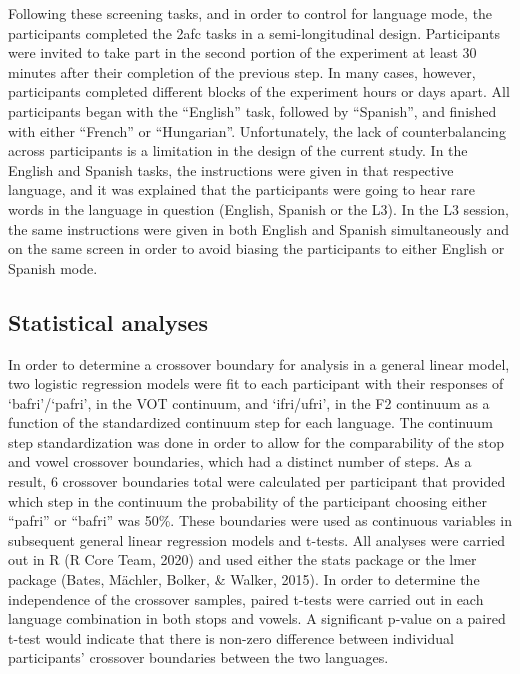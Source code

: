 \documentclass[
  man]{apa6}
\begin{document}
Following these screening tasks, and in order to control for language mode, the participants completed the 2afc tasks in a semi-longitudinal design.
Participants were invited to take part in the second portion of the experiment at least 30 minutes after their completion of the previous step. In many cases, however, participants completed different blocks of the experiment hours or days apart.
All participants began with the ``English'' task, followed by ``Spanish'', and finished with either ``French'' or ``Hungarian''. Unfortunately, the lack of counterbalancing across participants is a limitation in the design of the current study.
In the English and Spanish tasks, the instructions were given in that respective language, and it was explained that the participants were going to hear rare words in the language in question (English, Spanish or the L3).
In the L3 session, the same instructions were given in both English and Spanish simultaneously and on the same screen in order to avoid biasing the participants to either English or Spanish mode.

\hypertarget{statistical-analyses}{%
\subsection{Statistical analyses}\label{statistical-analyses}}

In order to determine a crossover boundary for analysis in a general linear model, two logistic regression models were fit to each participant with their responses of `bafri'/`pafri', in the VOT continuum, and `ifri/ufri', in the F2 continuum as a function of the standardized continuum step for each language.
The continuum step standardization was done in order to allow for the comparability of the stop and vowel crossover boundaries, which had a distinct number of steps.
As a result, 6 crossover boundaries total were calculated per participant that provided which step in the continuum the probability of the participant choosing either ``pafri'' or ``bafri'' was 50\%. These boundaries were used as continuous variables in subsequent general linear regression models and t-tests. All analyses were carried out in R (R Core Team, 2020) and used either the stats package or the lmer package (Bates, Mächler, Bolker, \& Walker, 2015). In order to determine the independence of the crossover samples, paired t-tests were carried out in each language combination in both stops and vowels. A significant p-value on a paired t-test would indicate that there is non-zero difference between individual participants' crossover boundaries between the two languages.
\end{document}

